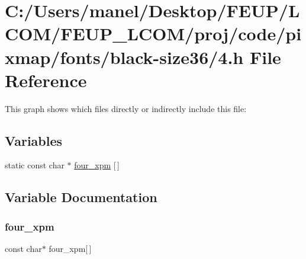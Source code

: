 \hypertarget{black-size36_24_8h}{}\section{C\+:/\+Users/manel/\+Desktop/\+F\+E\+U\+P/\+L\+C\+O\+M/\+F\+E\+U\+P\+\_\+\+L\+C\+O\+M/proj/code/pixmap/fonts/black-\/size36/4.h File Reference}
\label{black-size36_24_8h}
This graph shows which files directly or indirectly include this file\+:
\subsection*{Variables}
\begin{DoxyCompactItemize}
\item 
static const char $\ast$ \mbox{\hyperlink{black-size36_24_8h_a60b864aa38e7aec2d0363122b8a99f47}{four\+\_\+xpm}} \mbox{[}$\,$\mbox{]}
\end{DoxyCompactItemize}


\subsection{Variable Documentation}
\mbox{\label{black-size36_24_8h_a60b864aa38e7aec2d0363122b8a99f47}} 
\subsubsection{\texorpdfstring{four\_xpm}{four\_xpm}}
{\footnotesize\ttfamily const char$\ast$ four\+\_\+xpm\mbox{[}$\,$\mbox{]}\hspace{0.3cm}{\ttfamily [static]}}


